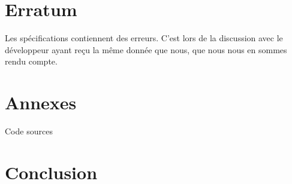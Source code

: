 \documentclass[a4paper, 11pt]{article}
\begin{document}
\section{Erratum}

Les spécifications contiennent des erreurs. C'est lors de la discussion avec le développeur ayant reçu la même donnée que nous, que nous nous en sommes rendu compte. 



\section{Annexes}

Code sources %






\section{Conclusion}


\end{document}
